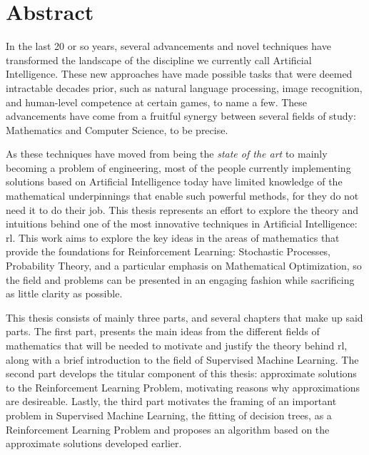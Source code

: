 \chapter*{Abstract}
In the last 20 or so years, several advancements and novel
techniques have transformed the landscape of the discipline we currently call
Artificial Intelligence. These new approaches have made possible tasks that were
deemed intractable decades prior, such as natural language processing, image
recognition, and human-level competence at certain games, to name a few. These
advancements have come from a fruitful synergy between several fields of study:
Mathematics and Computer Science, to be precise.

As these techniques have moved from being the \textit{state of the art} to
mainly becoming a problem of engineering, most of the people currently
implementing solutions based on Artificial Intelligence today have limited
knowledge of the mathematical underpinnings that enable such powerful methods,
for they do not need it to do their job. This thesis represents an effort to
explore the theory and intuitions behind one of the most innovative techniques
in Artificial Intelligence: \acf{rl}. This work aims to explore the key ideas in
the areas of mathematics that provide the foundations for Reinforcement
Learning: Stochastic Processes, Probability Theory, and a particular emphasis on
Mathematical Optimization, so the field and problems can be presented in an
engaging fashion while sacrificing as little clarity as possible.

This thesis consists of mainly three parts, and several chapters that make up
said parts. The first part, presents the main ideas from the different fields of
mathematics that will be needed to motivate and justify the theory behind
\ac{rl}, along with a brief introduction to the field of Supervised Machine
Learning. The second part develops the titular component of this thesis:
approximate solutions to the Reinforcement Learning Problem, motivating reasons
why approximations are desireable. Lastly, the third part motivates the framing
of an important problem in Supervised Machine Learning, the fitting of decision
trees, as a Reinforcement Learning Problem and proposes an algorithm based on
the approximate solutions developed earlier.